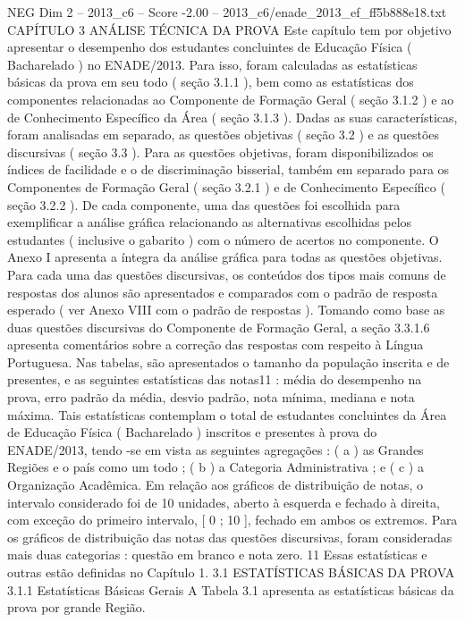 \begin{textsample}{NEG Dim 2 – 2013\_c6 – Score -2.00 – 2013\_c6/enade\_2013\_ef\_ff5b888e18.txt}  \label{ex:f2_neg_059}
CAPÍTULO 3 ANÁLISE TÉCNICA DA PROVA Este capítulo tem por objetivo apresentar o desempenho dos estudantes concluintes de Educação Física ( Bacharelado ) no ENADE/2013.
Para isso, foram calculadas as estatísticas básicas da prova em seu todo ( seção 3.1.1 ), bem como as estatísticas dos componentes relacionadas ao Componente de Formação Geral ( seção 3.1.2 ) e ao de Conhecimento Específico da Área ( seção 3.1.3 ).
Dadas as suas características, foram analisadas em separado, as questões objetivas ( seção 3.2 ) e as questões discursivas ( seção 3.3 ).
Para as questões objetivas, foram disponibilizados os índices de facilidade e o de discriminação bisserial, também em separado para os Componentes de Formação Geral ( seção 3.2.1 ) e de Conhecimento Específico ( seção 3.2.2 ).
De cada componente, uma das questões foi escolhida para exemplificar a análise gráfica relacionando as alternativas escolhidas pelos estudantes ( inclusive o gabarito ) com o número de acertos no componente.
O Anexo I apresenta a íntegra da análise gráfica para todas as questões objetivas.
Para cada uma das questões discursivas, os conteúdos dos tipos mais comuns de respostas dos alunos são apresentados e comparados com o padrão de resposta esperado ( ver Anexo VIII com o padrão de respostas ).
Tomando como base as duas questões discursivas do Componente de Formação Geral, a seção 3.3.1.6 apresenta comentários sobre a correção das respostas com respeito à Língua Portuguesa.
Nas tabelas, são apresentados o tamanho da população inscrita e de presentes, e as seguintes estatísticas das notas11 : média do desempenho na prova, erro padrão da média, desvio padrão, nota mínima, mediana e nota máxima.
Tais estatísticas contemplam o total de estudantes concluintes da Área de Educação Física ( Bacharelado ) inscritos e presentes à prova do ENADE/2013, tendo -se em vista as seguintes agregações : ( a ) as Grandes Regiões e o país como um todo ; ( b ) a Categoria Administrativa ; e ( c ) a Organização Acadêmica.
Em relação aos gráficos de distribuição de notas, o intervalo considerado foi de 10 unidades, aberto à esquerda e fechado à direita, com exceção do primeiro intervalo, [ 0 ; 10 ], fechado em ambos os extremos.
Para os gráficos de distribuição das notas das questões discursivas, foram consideradas mais duas categorias : questão em branco e nota zero. 11 Essas estatísticas e outras estão definidas no Capítulo 1. 3.1 ESTATÍSTICAS BÁSICAS DA PROVA 3.1.1 Estatísticas Básicas Gerais A Tabela 3.1 apresenta as estatísticas básicas da prova por grande Região.

\end{textsample}
